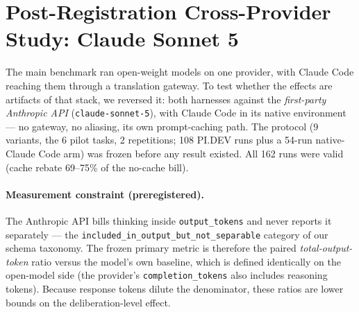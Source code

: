 \documentclass[11pt]{article}
\newcommand{\pidev}{PI.DEV}
\newcommand{\cc}{Claude Code}
\begin{document}
\section{Post-Registration Cross-Provider Study: Claude Sonnet 5}

The main benchmark ran open-weight models on one provider, with \cc{}
reaching them through a translation gateway. To test whether the effects
are artifacts of that stack, we reversed it: both harnesses against the
\emph{first-party Anthropic API} (\texttt{claude-sonnet-5}), with \cc{} in
its native environment --- no gateway, no aliasing, its own prompt-caching
path. The protocol (9 variants, the 6 pilot tasks, 2 repetitions; 108
\pidev{} runs plus a 54-run native-\cc{} arm) was frozen before any result
existed. All 162 runs were valid (cache rebate 69--75\% of the no-cache bill).

\paragraph{Measurement constraint (preregistered).} The Anthropic API
bills thinking inside \texttt{output\_tokens} and never reports it
separately --- the \texttt{included\_in\_output\_but\_not\_separable}
category of our schema taxonomy. The frozen primary metric is therefore
the paired \emph{total-output-token} ratio versus the model's own
baseline, which is defined identically on the open-model side (the
provider's \texttt{completion\_tokens} also includes reasoning tokens).
Because response tokens dilute the denominator, these ratios are lower
bounds on the deliberation-level effect.
\end{document}

